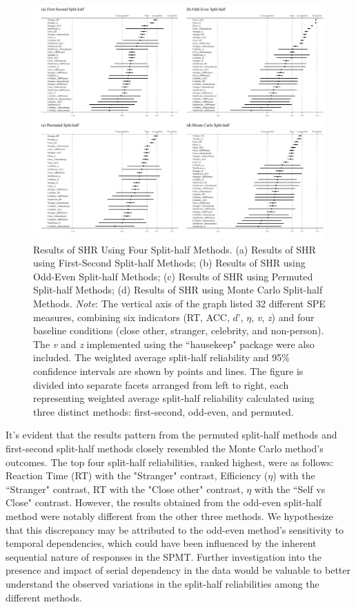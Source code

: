 \documentclass[sn-apa]{sn-jnl}%
\theoremstyle{thmstyleone}%
\theoremstyle{thmstyletwo}%
\theoremstyle{thmstylethree}%
\begin{document}
\begin{figure}[ht]
	\centering
	\includegraphics[width=1\textwidth]{./Figure/Fig3_SHR.png}
	\caption[Results of SHR Using Four Split-half Methods]{Results of SHR Using Four Split-half Methods. (a) Results of SHR using First-Second Split-half Methods; (b) Results of SHR using Odd-Even Split-half Methods; (c) Results of SHR using Permuted Split-half Methods; (d) Results of SHR using Monte Carlo Split-half Methods. \textit{Note}: The vertical axis of the graph listed 32 different SPE measures, combining six indicators (RT, ACC, $d’$, $\eta$, \textit{v}, \textit{z}) and four baseline conditions (close other, stranger, celebrity, and non-person). The \textit{v} and \textit{z} implemented using the ``hausekeep" package were also included. The weighted average split-half reliability and 95\% confidence intervals are shown by points and lines. The figure is divided into separate facets arranged from left to right, each representing weighted average split-half reliability calculated using three distinct methods: first-second, odd-even, and permuted. 
	}\label{fig:SHR_Result}
\end{figure}


It's evident that the results pattern from the permuted split-half methods and first-second split-half methods closely resembled the Monte Carlo method's outcomes. The top four split-half reliabilities, ranked highest, were as follows: Reaction Time (RT) with the "Stranger" contrast, Efficiency ($\eta$) with the ``Stranger" contrast, RT with the "Close other" contrast, $\eta$ with the ``Self vs Close" contrast. However, the results obtained from the odd-even split-half method were notably different from the other three methods. We hypothesize that this discrepancy may be attributed to the odd-even method's sensitivity to temporal dependencies, which could have been influenced by the inherent sequential nature of responses in the SPMT. Further investigation into the presence and impact of serial dependency in the data would be valuable to better understand the observed variations in the split-half reliabilities among the different methods.
\end{document}
